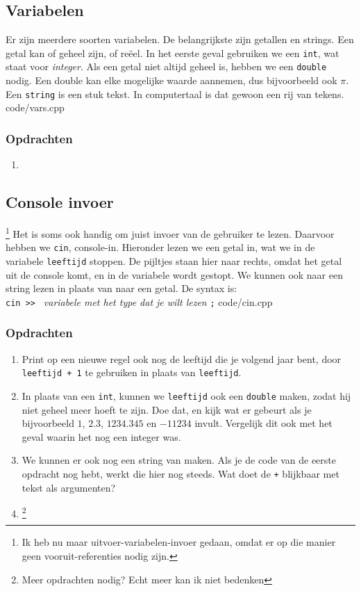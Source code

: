 \documentclass[12pt,a4paper]{article}
\newcommand{\code}{}
\newcommand{\icode}{\lstinline}
\begin{document}
\subsection{Variabelen}
Er zijn meerdere soorten variabelen. De belangrijkste zijn getallen en strings. Een getal kan of geheel zijn, of re\"eel. In het eerste geval gebruiken we een \icode{int}, wat staat voor \emph{integer}. Als een getal niet altijd geheel is, hebben we een \icode{double} nodig. Een double kan elke mogelijke waarde aannemen, dus bijvoorbeeld ook $\pi$.\\
Een \icode{string} is een stuk tekst. In computertaal is dat gewoon een rij van tekens.
\code{code/vars.cpp}
\subsubsection{Opdrachten}
\begin{enumerate}
		\item
\end{enumerate}


\subsection{Console invoer}\footnote{Ik heb nu maar uitvoer-variabelen-invoer gedaan, omdat er op die manier geen vooruit-referenties nodig zijn.}
Het is soms ook handig om juist invoer van de gebruiker te lezen. Daarvoor hebben we \icode{cin}, console-in. Hieronder lezen we een getal in, wat we in de variabele \icode{leeftijd} stoppen. De pijltjes staan hier naar rechts, omdat het getal uit de console komt, en in de variabele wordt gestopt. We kunnen ook naar een string lezen in plaats van naar een getal. De syntax is:\\
\icode{cin >> } \emph{variabele met het type dat je wilt lezen} \icode{;}
\code{code/cin.cpp}
\subsubsection{Opdrachten}
\begin{enumerate}
	\item Print op een nieuwe regel ook nog de leeftijd die je volgend jaar bent, door \icode{leeftijd + 1} te gebruiken in plaats van \icode{leeftijd}.
		\item
			In plaats van een \icode{int}, kunnen we \icode{leeftijd} ook een \icode{double} maken, zodat hij niet geheel meer hoeft te zijn. Doe dat, en kijk wat er gebeurt als je bijvoorbeeld $1$, $2.3$, $1234.345$ en $-11234$ invult. Vergelijk dit ook met het geval waarin het nog een integer was.
		\item
			We kunnen er ook nog een string van maken. Als je de code van de eerste opdracht nog hebt, werkt die hier nog steeds. Wat doet de \icode{+} blijkbaar met tekst als argumenten?
		\item
			\footnote{Meer opdrachten nodig? Echt meer kan ik niet bedenken}
\end{enumerate}
\end{document}
